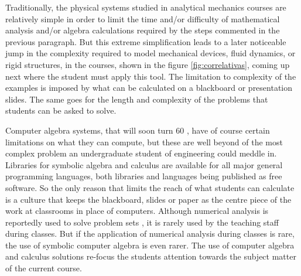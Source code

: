 Traditionally, the physical systems studied in analytical mechanics courses are relatively simple in order to limit the time and/or difficulty of mathematical analysis and/or algebra calculations required by the steps commented in the previous paragraph.
But this extreme simplification leads to a later noticeable jump in the complexity required to model mechanical devices, fluid dynamics, or rigid structures, in the courses, shown in the figure \ref{fig:correlativas}, coming up next where the student must apply this tool.
The limitation to complexity of the examples is imposed by what can be calculated on a blackboard or presentation slides.
The same goes for the length and complexity of the problems that students can be asked to solve.

Computer algebra systems, that will soon turn 60 \cite{ams}, have of course certain limitations on what they can compute, but these are well beyond of the most complex problem an undergraduate student of engineering could meddle in.
Libraries for symbolic algebra and calculus are available for all major general programming languages, both libraries and languages being published as free software.
So the only reason that limits the reach of what students can calculate is a culture that keeps the blackboard, slides or paper as the centre piece of the work at classrooms in place of computers.
Although numerical analysis is reportedly used to solve problem sets \cite{mirasso-raichman, caligaris-rodriguez}, it is rarely used by the teaching staff during classes.
But if the application of numerical analysis during classes is rare, the use of symbolic computer algebra is even rarer.
The use of computer algebra and calculus solutions re-focus the students attention towards the subject matter of the current course.
